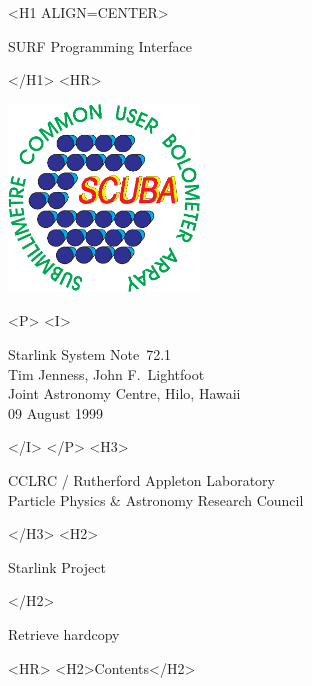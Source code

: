\documentclass[twoside,11pt]{article}
\newcommand{\stardoccategory}  {Starlink System Note}
\newcommand{\stardocsource}    {ssn\stardocnumber}
\newcommand{\stardocnumber}    {72.1}
\newcommand{\stardocauthors}   {Tim Jenness, John F.\ Lightfoot\\
                                Joint Astronomy Centre, Hilo, Hawaii}
\newcommand{\stardocdate}      {09 August 1999}
\newcommand{\stardoctitle}     {SURF Programming Interface}
\newcommand{\htmladdnormallink}[2]{#1}
\newcommand{\htmladdimg}[1]{}
\newcommand{\htmlref}[2]{#1}
\newcommand{\htmladdtonavigation}[1]{}
\newcommand{\xlabel}[1]{}
\renewcommand{\_}{\texttt{\symbol{95}}}
\begin{document}
\begin{htmlonly}
   \xlabel{}
   \begin{rawhtml} <H1 ALIGN=CENTER> \end{rawhtml}
      \stardoctitle
   \begin{rawhtml} </H1> <HR> \end{rawhtml}

\includegraphics[width=2.0in]{ssn72_logo.eps}

   \begin{rawhtml} <P> <I> \end{rawhtml}
   \stardoccategory\ \stardocnumber \\
   \stardocauthors \\
   \stardocdate
   \begin{rawhtml} </I> </P> <H3> \end{rawhtml}
      \htmladdnormallink{CCLRC}{http://www.cclrc.ac.uk} /
      \htmladdnormallink{Rutherford Appleton Laboratory}
                        {http://www.cclrc.ac.uk/ral} \\
      \htmladdnormallink{Particle Physics \& Astronomy Research Council}
                        {http://www.pparc.ac.uk} \\
   \begin{rawhtml} </H3> <H2> \end{rawhtml}
      \htmladdnormallink{Starlink Project}{http://www.starlink.rl.ac.uk/}
   \begin{rawhtml} </H2> \end{rawhtml}
   \htmladdnormallink{\htmladdimg{source.gif} Retrieve hardcopy}
      {http://www.starlink.rl.ac.uk/cgi-bin/hcserver?\stardocsource}\\

  \label{stardoccontents}
  \begin{rawhtml} 
    <HR>
    <H2>Contents</H2>
  \end{rawhtml}
  \htmladdtonavigation{\htmlref{\htmladdimg{contents_motif.gif}}
        {stardoccontents}}


\end{htmlonly}
\end{document}
